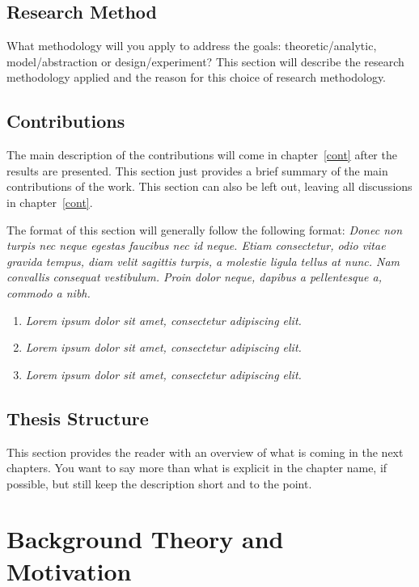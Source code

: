 \documentclass[a4paper]{book}
\begin{document}
\section{Research Method}
\label{sec:researchMethod}

What methodology will you apply to address the goals: theoretic/analytic, model/abstraction or design/experiment? This section will describe the research methodology applied and the reason for this choice of research methodology.

\section{Contributions}
\label{sec:IntroContributions}

The main description of the contributions will come in chapter~\ref{cont} after the results are presented. This section just provides a brief summary of the main contributions of the work. This section can also be left out, leaving all discussions in chapter~\ref{cont}.

The format of this section will generally follow the following format:
{\it
Donec non turpis nec neque egestas faucibus nec id neque. Etiam consectetur, odio vitae gravida tempus, diam velit sagittis turpis, a molestie ligula tellus at nunc. Nam convallis consequat vestibulum. Proin dolor neque, dapibus a pellentesque a, commodo a nibh.}

\begin{enumerate}
    \item {\it Lorem ipsum dolor sit amet, consectetur adipiscing elit.}
    \item {\it Lorem ipsum dolor sit amet, consectetur adipiscing elit.}
    \item {\it Lorem ipsum dolor sit amet, consectetur adipiscing elit.}
\end{enumerate}


\section{Thesis Structure}
\label{sec:thesisStructure}

This section provides the reader with an overview of what is coming in the next chapters. You want to say more than what is explicit in the chapter name, if possible, but still keep the description short and to the point.


\chapter{Background Theory and Motivation}\label{T-B}
\label{cha:TheoryAndBackground}
\end{document}
